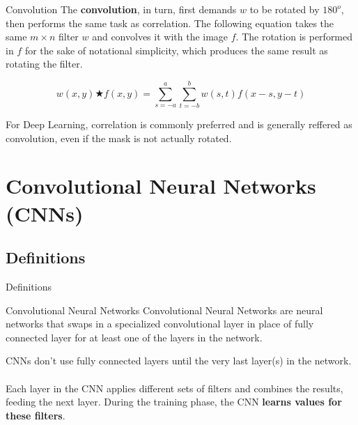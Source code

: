 \documentclass{beamer}
\begin{document}
    \begin{frame}{Convolution}
        The \textbf{convolution}, in turn, first demands $w$ to be rotated by $180^o$,
        then performs the same task as correlation. The following equation
        takes the same $m\times n$ filter $w$ and convolves it
        with the image $f$. The rotation is performed in $f$ for the sake
        of notational simplicity, which produces the same result as rotating the filter.

        \begin{equation}
            w(x,y) \bigstar f(x,y) = \sum\limits_{s=-a}^{a} \sum\limits_{t=-b}^{b} w(s,t)f(x - s, y - t)
        \end{equation}

        For Deep Learning, correlation is commonly preferred and is generally reffered as 
        convolution, even if the mask is not actually rotated.
    \end{frame}


\section{Convolutional Neural Networks (CNNs)}

    \subsection{Definitions}
    \begin{frame}{Definitions}

        \begin{block}{Convolutional Neural Networks}
            Convolutional Neural Networks are neural networks
            that swaps in a specialized convolutional layer in
            place of fully connected layer for at least one of
            the layers in the network.
        \end{block}

        CNNs don't use fully connected layers until the very last
        layer(s) in the network.\\~\\

        Each layer in the CNN
        applies different sets of filters and combines the results,
        feeding the next layer. During the training phase, 
        the CNN \textbf{learns values for these filters}.
            
    \end{frame}
\end{document}
